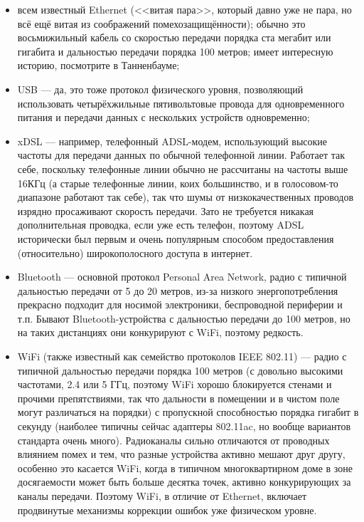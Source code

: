 \documentclass[a5paper]{article}
\begin{document}
\begin{itemize}
    \item всем известный Ethernet (<<витая пара>>, который давно уже не пара, но всё ещё витая из соображений помехозащищённости); обычно это восьмижильный кабель со скоростью передачи порядка ста мегабит или гигабита и дальностью передачи порядка 100 метров; имеет интересную историю, посмотрите в Танненбауме;
    \item USB --- да, это тоже протокол физического уровня, позволяющий использовать четырёхжильные пятивольтовые провода для одновременного питания и передачи данных с нескольких устройств одновременно;
    \item xDSL --- например, телефонный ADSL-модем, использующий высокие частоты для передачи данных по обычной телефонной линии. Работает так себе, поскольку телефонные линии обычно не рассчитаны на частоты выше 16КГц (а старые телефонные линии, коих большинство, и в голосовом-то диапазоне работают так себе), так что шумы от низкокачественных проводов изрядно просаживают скорость передачи. Зато не требуется никакая дополнительная проводка, если уже есть телефон, поэтому ADSL исторически был первым и очень популярным способом предоставления (относительно) широкополосного доступа в интернет.
    \item Bluetooth --- основной протокол Personal Area Network, радио с типичной дальностью передачи от 5 до 20 метров, из-за низкого энергопотребления прекрасно подходит для носимой электроники, беспроводной периферии и т.п. Бывают Bluetooth-устройства с дальностью передачи до 100 метров, но на таких дистанциях они конкурируют с WiFi, поэтому редкость.
    \item WiFi (также известный как семейство протоколов IEEE 802.11) --- радио с типичной дальностью передачи порядка 100 метров (с довольно высокими частотами, 2.4 или 5 ГГц, поэтому WiFi хорошо блокируется стенами и прочими препятствиями, так что дальности в помещении и в чистом поле могут различаться на порядки) с пропускной способностью порядка гигабит в секунду (наиболее типичны сейчас адаптеры 802.11ac, но вообще вариантов стандарта очень много). Радиоканалы сильно отличаются от проводных влиянием помех и тем, что разные устройства активно мешают друг другу, особенно это касается WiFi, когда в типичном многоквартирном доме в зоне досягаемости может быть больше десятка точек, активно конкурирующих за каналы передачи. Поэтому WiFi, в отличие от Ethernet, включает продвинутые механизмы коррекции ошибок уже физическом уровне.

\end{itemize}
\end{document}
